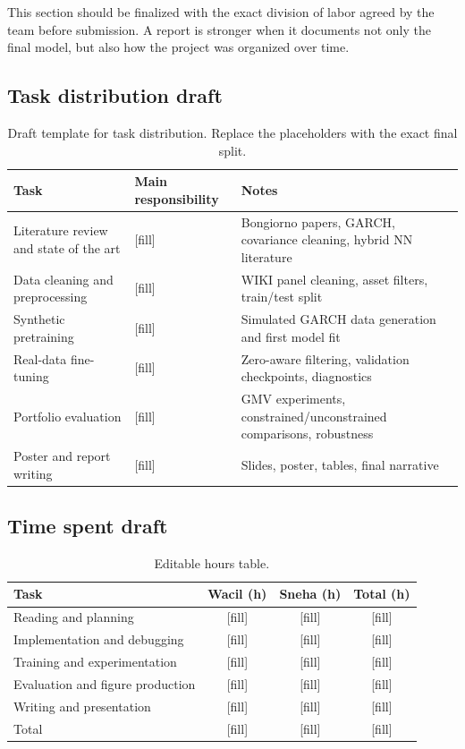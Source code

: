 \documentclass[11pt,a4paper]{article}
\begin{document}
This section should be finalized with the exact division of labor agreed by the team before submission. A report is stronger when it documents not only the final model, but also how the project was organized over time.

\subsection{Task distribution draft}

\begin{table}[H]
\centering
\caption{Draft template for task distribution. Replace the placeholders with the exact final split.}
\label{tab:task-distribution}
\begin{tabularx}{\textwidth}{lXX}
\toprule
Task & Main responsibility & Notes \\
\midrule
Literature review and state of the art & [fill] & Bongiorno papers, GARCH, covariance cleaning, hybrid NN literature \\
Data cleaning and preprocessing & [fill] & WIKI panel cleaning, asset filters, train/test split \\
Synthetic pretraining & [fill] & Simulated GARCH data generation and first model fit \\
Real-data fine-tuning & [fill] & Zero-aware filtering, validation checkpoints, diagnostics \\
Portfolio evaluation & [fill] & GMV experiments, constrained/unconstrained comparisons, robustness \\
Poster and report writing & [fill] & Slides, poster, tables, final narrative \\
\bottomrule
\end{tabularx}
\end{table}

\subsection{Time spent draft}

\begin{table}[H]
\centering
\caption{Editable hours table.}
\label{tab:hours}
\begin{tabular}{lccc}
\toprule
Task & Wacil (h) & Sneha (h) & Total (h) \\
\midrule
Reading and planning & [fill] & [fill] & [fill] \\
Implementation and debugging & [fill] & [fill] & [fill] \\
Training and experimentation & [fill] & [fill] & [fill] \\
Evaluation and figure production & [fill] & [fill] & [fill] \\
Writing and presentation & [fill] & [fill] & [fill] \\
\midrule
Total & [fill] & [fill] & [fill] \\
\bottomrule
\end{tabular}
\end{table}
\end{document}
